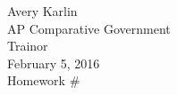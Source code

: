 \documentclass[12pt]{article}
\title{\Title}
\date{\Date}
\author{\Author}
\newcommand{\publisher}{Trainor}
\newcommand{\class}{AP Comparative Government}
\newcommand{\Title}{Homework \#}
\newcommand{\Author}{Avery Karlin}
\newcommand{\Date}{February 5, 2016}
\begin{document}
\begin{flushleft}
\Author \\
\class \\
\publisher \\
\Date \\
\Title \\
\end{flushleft}

\end{document}
